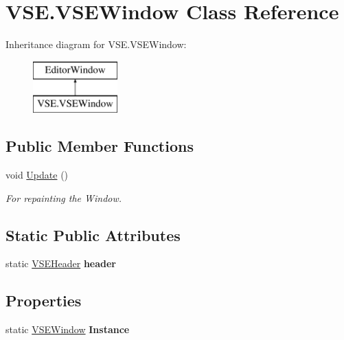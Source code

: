 \hypertarget{class_v_s_e_1_1_v_s_e_window}{}\section{V\+S\+E.\+V\+S\+E\+Window Class Reference}
\label{class_v_s_e_1_1_v_s_e_window}
Inheritance diagram for V\+S\+E.\+V\+S\+E\+Window\+:\begin{figure}[H]
\begin{center}
\leavevmode
\includegraphics[height=2.000000cm]{class_v_s_e_1_1_v_s_e_window}
\end{center}
\end{figure}
\subsection*{Public Member Functions}
\begin{DoxyCompactItemize}
\item 
void \hyperlink{class_v_s_e_1_1_v_s_e_window_a3c82a480fd6c38b68caec54e7943a322}{Update} ()
\begin{DoxyCompactList}\small\item\em For repainting the Window. \end{DoxyCompactList}\end{DoxyCompactItemize}
\subsection*{Static Public Attributes}
\begin{DoxyCompactItemize}
\item 
static \hyperlink{class_v_s_e_header}{V\+S\+E\+Header} {\bfseries header}\hypertarget{class_v_s_e_1_1_v_s_e_window_a37871719cb2069fe48e772de7c5b4a4c}{}\label{class_v_s_e_1_1_v_s_e_window_a37871719cb2069fe48e772de7c5b4a4c}

\end{DoxyCompactItemize}
\subsection*{Properties}
\begin{DoxyCompactItemize}
\item 
static \hyperlink{class_v_s_e_1_1_v_s_e_window}{V\+S\+E\+Window} {\bfseries Instance}\hypertarget{class_v_s_e_1_1_v_s_e_window_aa825c1d4f7eaf9ea047811d6a7ca4718}{}\label{class_v_s_e_1_1_v_s_e_window_aa825c1d4f7eaf9ea047811d6a7ca4718}

\end{DoxyCompactItemize}


